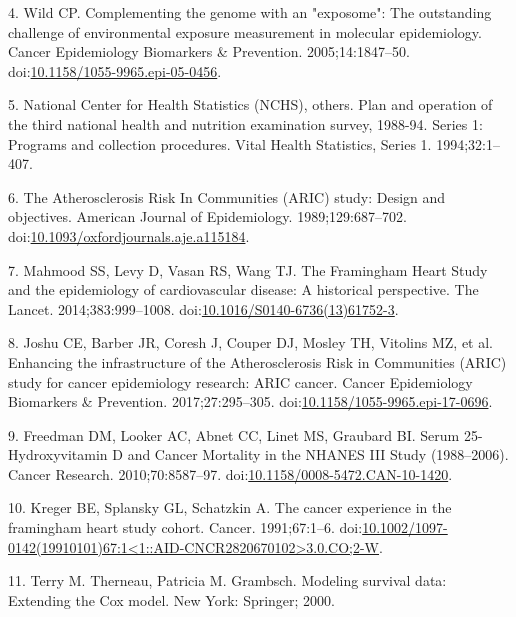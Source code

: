 \documentclass[12pt,oneside]{reedthesis}
\theoremstyle{definition}
\theoremstyle{definition}
\theoremstyle{definition}
\theoremstyle{remark}
\begin{document}
\leavevmode\hypertarget{ref-Wild_2005}{}%
4. Wild CP. Complementing the genome with an "exposome": The outstanding
challenge of environmental exposure measurement in molecular
epidemiology. Cancer Epidemiology Biomarkers \& Prevention.
2005;14:1847--50.
doi:\href{https://doi.org/10.1158/1055-9965.epi-05-0456}{10.1158/1055-9965.epi-05-0456}.

\leavevmode\hypertarget{ref-nhanes_1994}{}%
5. National Center for Health Statistics (NCHS), others. Plan and
operation of the third national health and nutrition examination survey,
1988-94. Series 1: Programs and collection procedures. Vital Health
Statistics, Series 1. 1994;32:1--407.

\leavevmode\hypertarget{ref-ARIC_1989}{}%
6. The Atherosclerosis Risk In Communities (ARIC) study: Design and
objectives. American Journal of Epidemiology. 1989;129:687--702.
doi:\href{https://doi.org/10.1093/oxfordjournals.aje.a115184}{10.1093/oxfordjournals.aje.a115184}.

\leavevmode\hypertarget{ref-Mahmood_2014}{}%
7. Mahmood SS, Levy D, Vasan RS, Wang TJ. The Framingham Heart Study and
the epidemiology of cardiovascular disease: A historical perspective.
The Lancet. 2014;383:999--1008.
doi:\href{https://doi.org/10.1016/S0140-6736(13)61752-3}{10.1016/S0140-6736(13)61752-3}.

\leavevmode\hypertarget{ref-Joshu_2017}{}%
8. Joshu CE, Barber JR, Coresh J, Couper DJ, Mosley TH, Vitolins MZ, et
al. Enhancing the infrastructure of the Atherosclerosis Risk in
Communities (ARIC) study for cancer epidemiology research: ARIC cancer.
Cancer Epidemiology Biomarkers \& Prevention. 2017;27:295--305.
doi:\href{https://doi.org/10.1158/1055-9965.epi-17-0696}{10.1158/1055-9965.epi-17-0696}.

\leavevmode\hypertarget{ref-Freedman_2010}{}%
9. Freedman DM, Looker AC, Abnet CC, Linet MS, Graubard BI. Serum
25-Hydroxyvitamin D and Cancer Mortality in the NHANES III Study
(1988--2006). Cancer Research. 2010;70:8587--97.
doi:\href{https://doi.org/10.1158/0008-5472.CAN-10-1420}{10.1158/0008-5472.CAN-10-1420}.

\leavevmode\hypertarget{ref-Kreger_1991}{}%
10. Kreger BE, Splansky GL, Schatzkin A. The cancer experience in the
framingham heart study cohort. Cancer. 1991;67:1--6.
doi:\href{https://doi.org/10.1002/1097-0142(19910101)67:1\%3C1::AID-CNCR2820670102\%3E3.0.CO;2-W}{10.1002/1097-0142(19910101)67:1\textless{}1::AID-CNCR2820670102\textgreater{}3.0.CO;2-W}.

\leavevmode\hypertarget{ref-Therneau_2000}{}%
11. Terry M. Therneau, Patricia M. Grambsch. Modeling survival data:
Extending the Cox model. New York: Springer; 2000.
\end{document}
